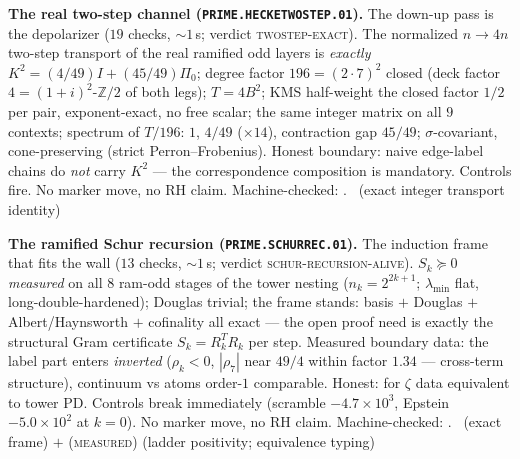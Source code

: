 \documentclass[11pt,a4paper]{article}
\newcommand{\Z}{\mathbb{Z}}
\theoremstyle{definition}
\begin{document}
\par\smallskip\noindent\textbf{The real two-step channel
(\texttt{PRIME.HECKETWOSTEP.01}).}
The down-up pass is the depolarizer ($19$ checks, ${\sim}1$\,s;
verdict \textsc{twostep-exact}).  The normalized $n\to4n$ two-step
transport of the real ramified odd layers is \emph{exactly}
$K^2=(4/49)I+(45/49)\Pi_0$; degree factor $196=(2\cdot7)^2$ closed
(deck factor $4=(1+i)^2$-$\Z/2$ of both legs); $T=4B^2$; KMS
half-weight the closed factor $1/2$ per pair, exponent-exact, no
free scalar; the same integer matrix on all $9$ contexts; spectrum
of $T/196$: $1$, $4/49$ ($\times14$), contraction gap $45/49$;
$\sigma$-covariant, cone-preserving (strict Perron--Frobenius).
Honest boundary: naive edge-label chains do \emph{not} carry $K^2$
--- the correspondence composition is mandatory.  Controls fire.
No marker move, no RH claim.
Machine-checked: .
\mE\ (exact integer transport identity)
\par\smallskip

\par\smallskip\noindent\textbf{The ramified Schur recursion
(\texttt{PRIME.SCHURREC.01}).}
The induction frame that fits the wall ($13$ checks, ${\sim}1$\,s;
verdict \textsc{schur-recursion-alive}).  $S_k\succeq0$
\emph{measured} on all $8$ ram-odd stages of the tower nesting
($n_k=2^{2k+1}$; $\lambda_{\min}$ flat, long-double-hardened);
Douglas trivial; the frame stands: basis $+$ Douglas $+$
Albert/Haynsworth $+$ cofinality all exact --- the open proof need
is exactly the structural Gram certificate $S_k=R_k^TR_k$ per step.
Measured boundary data: the label part enters \emph{inverted}
($\rho_k<0$, $|\rho_7|$ near $49/4$ within factor $1.34$ ---
cross-term structure), continuum vs atoms order-$1$ comparable.
Honest: for $\zeta$ data equivalent to tower PD.  Controls break
immediately (scramble $-4.7\times10^3$, Epstein
$-5.0\times10^2$ at $k=0$).  No marker move, no RH claim.
Machine-checked: .
\mE\ (exact frame) $+$ (\textsc{measured}) (ladder positivity;
equivalence typing)
\par\smallskip
\end{document}
